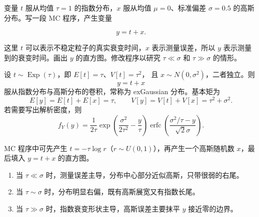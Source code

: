 \begin{question}
变量 \(t\) 服从均值 \(\tau=1\) 的指数分布，\(x\) 服从均值
\(\mu=0\)、标准偏差 \(\sigma=0.5\) 的高斯分布。写一段 MC 程序，产生变量

\[
y=t+x.
\]

这里 \(t\) 可以表示不稳定粒子的真实衰变时间，\(x\) 表示测量误差，所以
\(y\) 表示测量到的衰变时间。画出 \(y\) 的直方图。修改程序以研究
\(\tau\ll\sigma\) 和 \(\tau\gg\sigma\) 的情形。
\begin{solution}
设 \(t\sim\operatorname{Exp}(\tau)\)，即 \(E[t]=\tau\)、\(V[t]=\tau^2\)，
且 \(x\sim N(0,\sigma^2)\)，二者独立。则
\[
y=t+x
\]
服从指数分布与高斯分布的卷积，常称为 exGaussian 分布。基本矩为
\[
E[y]=E[t]+E[x]=\tau,
\qquad
V[y]=V[t]+V[x]=\tau^2+\sigma^2.
\]
若需要写出解析密度，则
\[
f_Y(y)=\frac{1}{2\tau}
\exp\left(\frac{\sigma^2}{2\tau^2}-\frac{y}{\tau}\right)
\operatorname{erfc}\left(\frac{\sigma^2/\tau-y}{\sqrt2\sigma}\right).
\]

MC 程序中可先产生 \(t=-\tau\log r\)（\(r\sim U(0,1)\)），再产生一个高斯随机数
\(x\)，最后填入 \(y=t+x\) 的直方图。
\begin{enumerate}
\item 当 \(\tau\ll\sigma\) 时，测量误差主导，分布中心部分近似高斯，只带很弱的右尾。
\item 当 \(\tau\sim\sigma\) 时，分布明显右偏，既有高斯展宽又有指数长尾。
\item 当 \(\tau\gg\sigma\) 时，指数衰变形状主导，高斯误差主要抹平 \(y\) 接近零的边界。
\end{enumerate}
\end{solution}
\end{question}


